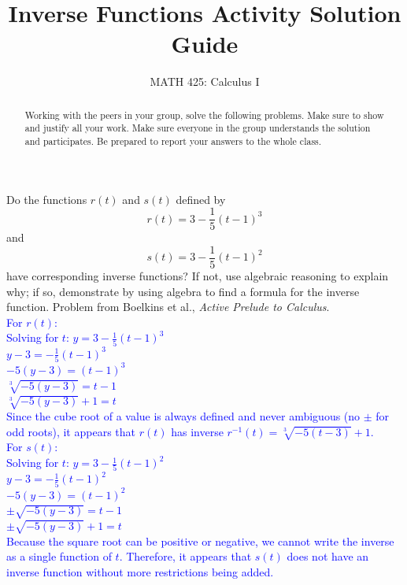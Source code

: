 \documentclass{ximera}
\title{Inverse Functions Activity Solution Guide}
\author{MATH 425: Calculus I}
\begin{document}
\begin{abstract}
    Working with the peers in your group, solve the following problems. Make sure to show and justify all your work. Make sure everyone in the group understands the solution and participates. Be prepared to report your answers to the whole class. 
\end{abstract}
\maketitle

\begin{exercise}
     Do the functions $r(t)$ and $s(t)$ defined by
        \[r(t)=3-\frac15(t-1)^3\]
    and 
        \[s(t)=3-\frac15(t-1)^2\]
    have corresponding inverse functions? If not, use algebraic reasoning to explain why; if so, demonstrate by using algebra to find a formula for the inverse function.
    Problem from Boelkins et al., \textit{Active Prelude to Calculus}.\\
    \textcolor{blue}{For $r(t)$:\\
    Solving for $t$: $y=3-\frac15(t-1)^3$\\
    $y-3=-\frac15(t-1)^3$\\
    $-5(y-3)=(t-1)^3$\\
    $\sqrt[3]{-5(y-3)}=t-1$\\
    $\sqrt[3]{-5(y-3)}+1=t$\\
    Since the cube root of a value is always defined and never ambiguous (no $\pm$ for odd roots), it appears that $r(t)$ has inverse $r^{-1}(t)=\sqrt[3]{-5(t-3)}+1$.\\
    For $s(t)$:\\
    Solving for $t$:  $y=3-\frac15(t-1)^2$\\
    $y-3=-\frac15(t-1)^2$\\
    $-5(y-3)=(t-1)^2$\\
    $\pm\sqrt{-5(y-3)}=t-1$\\
    $\pm\sqrt{-5(y-3)}+1=t$\\
    Because the square root can be positive or negative, we cannot write the inverse as a single function of $t$. Therefore, it appears that $s(t)$ does not have an inverse function without more restrictions being added.  }
\end{exercise}
\end{document}
